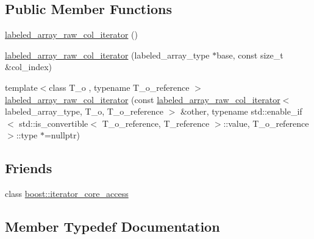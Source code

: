 \subsection*{Public Member Functions}
\begin{DoxyCompactItemize}
\item 
\hyperlink{classIceBRG_1_1labeled__array__raw__col__iterator_a11d12297c01226486507f3233a91aae2}{labeled\+\_\+array\+\_\+raw\+\_\+col\+\_\+iterator} ()
\item 
\hyperlink{classIceBRG_1_1labeled__array__raw__col__iterator_afd1ea008ebc610e8ab7dbe1f4a6d2283}{labeled\+\_\+array\+\_\+raw\+\_\+col\+\_\+iterator} (labeled\+\_\+array\+\_\+type $\ast$base, const size\+\_\+t \&col\+\_\+index)
\item 
{\footnotesize template$<$class T\+\_\+o , typename T\+\_\+o\+\_\+reference $>$ }\\\hyperlink{classIceBRG_1_1labeled__array__raw__col__iterator_adfe2e2d7155394f36b742406d7d7293b}{labeled\+\_\+array\+\_\+raw\+\_\+col\+\_\+iterator} (const \hyperlink{classIceBRG_1_1labeled__array__raw__col__iterator}{labeled\+\_\+array\+\_\+raw\+\_\+col\+\_\+iterator}$<$ labeled\+\_\+array\+\_\+type, T\+\_\+o, T\+\_\+o\+\_\+reference $>$ \&other, typename std\+::enable\+\_\+if$<$ std\+::is\+\_\+convertible$<$ T\+\_\+o\+\_\+reference, T\+\_\+reference $>$\+::value, T\+\_\+o\+\_\+reference $>$\+::type $\ast$=nullptr)
\end{DoxyCompactItemize}
\subsection*{Friends}
\begin{DoxyCompactItemize}
\item 
class \hyperlink{classIceBRG_1_1labeled__array__raw__col__iterator_ac09f73e325921cc50ebcd96bed0f8096}{boost\+::iterator\+\_\+core\+\_\+access}
\end{DoxyCompactItemize}


\subsection{Member Typedef Documentation}
\hypertarget{classIceBRG_1_1labeled__array__raw__col__iterator_aadef267d0a30f898af83e9ebf6716b46}{}

